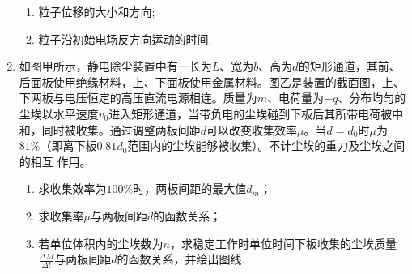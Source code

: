 \begin{enumerate}[leftmargin=0em]
\begin{enumerate}
\item 
粒子位移的大小和方向;

\item 
粒子沿初始电场反方向运动的时间.


\end{enumerate}
\begin{figure}[h!]
\flushright

\end{figure}





\newpage
\item
{}
如图甲所示，静电除尘装置中有一长为$ L $、宽为$ b $、高为$ d $的矩形通道，其前、后面板使用绝缘材料，上、下面板使用金属材料。图乙是装置的截面图，上、下两板与电压恒定的高压直流电源相连。质量为$ m $、电荷量为$ -q $、分布均匀的尘埃以水平速度$ v_{0} $进入矩形通道，当带负电的尘埃碰到下板后其所带电荷被中和，同时被收集。通过调整两板间距$ d $可以改变收集效率$ \mu $。当$ d=d_{0} $时$ \mu $为$ 81 \% $（即离下板$ 0.81d_{0} $范围内的尘埃能够被收集）。不计尘埃的重力及尘埃之间的相互
作用。
\begin{enumerate}
\renewcommand{\labelenumi}{\arabic{enumi}.}
\item
求收集效率为$ 100 \% $时，两板间距的最大值$ d_m $；
\item 
求收集率$ \mu $与两板间距$ d $的函数关系；
\item 
若单位体积内的尘埃数为$ n $，求稳定工作时单位时间下板收集的尘埃质量$ \frac{\Delta M}{\Delta t} $与两板间距$ d $的函数关系，并绘出图线.



\end{enumerate}
\end{enumerate}
